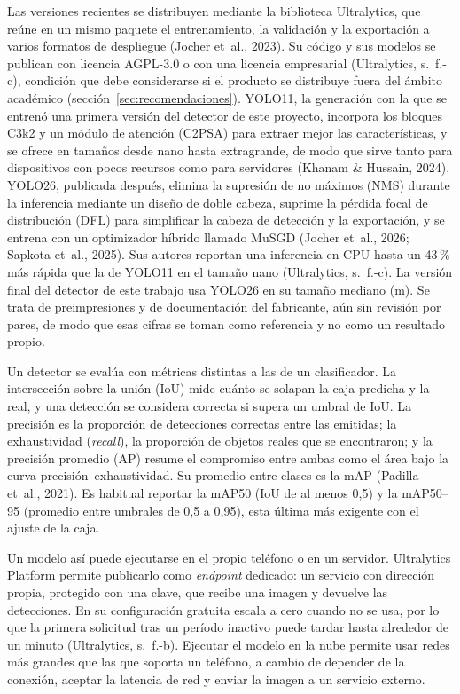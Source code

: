 Las versiones recientes se distribuyen mediante la biblioteca Ultralytics, que
reúne en un mismo paquete el entrenamiento, la validación y la exportación a
varios formatos de despliegue (Jocher et~al., 2023). Su código y sus modelos se
publican con licencia AGPL-3.0 o con una licencia empresarial (Ultralytics,
s.~f.-c), condición que debe considerarse si el producto se distribuye fuera
del ámbito académico (sección~\ref{sec:recomendaciones}). YOLO11, la
generación con la que se entrenó una primera versión del detector de este proyecto, incorpora los
bloques C3k2 y un módulo de atención (C2PSA) para extraer mejor las
características, y se ofrece en tamaños desde nano hasta extragrande, de modo
que sirve tanto para dispositivos con pocos recursos como para servidores
(Khanam \& Hussain, 2024). YOLO26, publicada después, elimina la supresión de
no máximos (NMS) durante la inferencia mediante un diseño de doble cabeza,
suprime la pérdida focal de distribución (DFL) para simplificar la cabeza de
detección y la exportación, y se entrena con un optimizador híbrido llamado
MuSGD (Jocher et~al., 2026; Sapkota et~al., 2025). Sus autores reportan una
inferencia en CPU hasta un 43\,\% más rápida que la de YOLO11 en el tamaño
nano (Ultralytics, s.~f.-c). La versión final del detector de este trabajo usa YOLO26 en su tamaño mediano (m). Se trata de preimpresiones y de documentación del
fabricante, aún sin revisión por pares, de modo que esas cifras se toman como
referencia y no como un resultado propio.

Un detector se evalúa con métricas distintas a las de un clasificador. La
intersección sobre la unión (IoU) mide cuánto se solapan la caja predicha y la
real, y una detección se considera correcta si supera un umbral de IoU. La
precisión es la proporción de detecciones correctas entre las emitidas; la
exhaustividad (\emph{recall}), la proporción de objetos reales que se
encontraron; y la precisión promedio (AP) resume el compromiso entre ambas como
el área bajo la curva precisión--exhaustividad. Su promedio entre clases es la
mAP (Padilla et~al., 2021). Es habitual reportar la mAP50 (IoU de al menos 0,5)
y la mAP50--95 (promedio entre umbrales de 0,5 a 0,95), esta última más
exigente con el ajuste de la caja.

Un modelo así puede ejecutarse en el propio teléfono o en un servidor. Ultralytics
Platform permite publicarlo como \emph{endpoint} dedicado: un servicio con
dirección propia, protegido con una clave, que recibe una imagen y devuelve las
detecciones. En su configuración gratuita escala a cero cuando no se usa, por
lo que la primera solicitud tras un período inactivo puede tardar hasta
alrededor de un minuto (Ultralytics, s.~f.-b). Ejecutar el modelo en la nube
permite usar redes más grandes que las que soporta un teléfono, a cambio de
depender de la conexión, aceptar la latencia de red y enviar la imagen a un
servicio externo.

